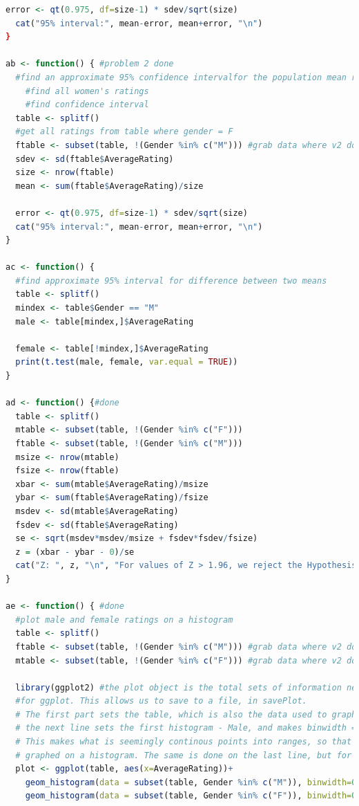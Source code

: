 \documentclass{article}
\begin{document}
\begin{lstlisting}[language=R]
  error <- qt(0.975, df=size-1) * sdev/sqrt(size)
  cat("95% interval:", mean-error, mean+error, "\n")
}

ab <- function() { #problem 2 done
  #find an approximate 95% confidence intervalfor the population mean rating by men
    #find all women's ratings
    #find confidence interval
  table <- splitf()
  #get all ratings from table where gender = F
  ftable <- subset(table, !(Gender %in% c("M"))) #grab data where v2 doesn't have F
  sdev <- sd(ftable$AverageRating)
  size <- nrow(ftable)
  mean <- sum(ftable$AverageRating)/size

  error <- qt(0.975, df=size-1) * sdev/sqrt(size)
  cat("95% interval:", mean-error, mean+error, "\n")
}

ac <- function() {
  #find approximate 95% interval for difference between two means
  table <- splitf()
  mindex <- table$Gender == "M"
  male <- table[mindex,]$AverageRating

  female <- table[!mindex,]$AverageRating
  print(t.test(male, female, var.equal = TRUE))
}

ad <- function() {#done
  table <- splitf()
  mtable <- subset(table, !(Gender %in% c("F")))
  ftable <- subset(table, !(Gender %in% c("M")))
  msize <- nrow(mtable)
  fsize <- nrow(ftable)
  xbar <- sum(mtable$AverageRating)/msize
  ybar <- sum(ftable$AverageRating)/fsize
  msdev <- sd(mtable$AverageRating)
  fsdev <- sd(ftable$AverageRating)
  se <- sqrt(msdev*msdev/msize + fsdev*fsdev/fsize)
  z = (xbar - ybar - 0)/se
  cat("Z: ", z, "\n", "For values of Z > 1.96, we reject the Hypothesis that the population means are equal\n")
}

ae <- function() { #done
  #plot male and female ratings on a histogram
  table <- splitf()
  ftable <- subset(table, !(Gender %in% c("M"))) #grab data where v2 doesn't have F
  mtable <- subset(table, !(Gender %in% c("F"))) #grab data where v2 doesn't have F

  library(ggplot2) #the plot object is the total sets of information needed
  #for ggplot. This allows us to save to a file, in savePlot. 
  # The first part sets the table, which is also the data used to graph.
  # the next line sets the first histogram - Male, and makes binwidth = 0.1.
  # This makes what is seemingly continous points into ranges, so that they can be
  # graphed on a histogram. The same is done on the last line, but for women.
  plot <- ggplot(table, aes(x=AverageRating))+
    geom_histogram(data = subset(table, Gender %in% c("M")), binwidth=0.1, fill="blue", alpha=0.2)+
    geom_histogram(data = subset(table, Gender %in% c("F")), binwidth=0.1, fill="red", alpha=0.2)


\end{lstlisting}
\end{document}
